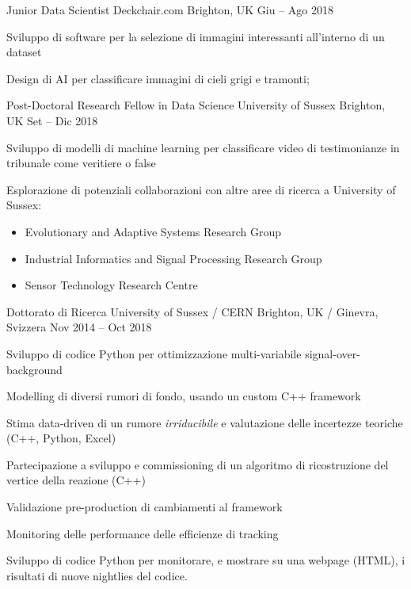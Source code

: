 \begin{cventries}
    \cventry
    {Junior Data Scientist}
    {Deckchair.com}
    {Brighton, UK}
    {Giu -- Ago 2018}
    {
      \begin{cvitems}
        \item Sviluppo di software per la selezione di immagini interessanti all'interno di un dataset
        \item Design di AI per classificare immagini di cieli grigi e tramonti;
      \end{cvitems}
    }
  \end{cventries}

  \begin{cventries}
    \cventry
    {Post-Doctoral Research Fellow in Data Science}
    {University of Sussex}
    {Brighton, UK}
    {Set -- Dic 2018}
    {
      \begin{cvitems}
        \item Sviluppo di modelli di machine learning per classificare video di testimonianze in tribunale come veritiere o false
        \item Esplorazione di potenziali collaborazioni con altre aree di ricerca a University of Sussex: 
        \begin{itemize}
          \item Evolutionary and Adaptive Systems Research Group
          \item Industrial Informatics and Signal Processing Research Group
          \item Sensor Technology Research Centre
        \end{itemize}
      \end{cvitems}
    }
  \end{cventries}

  \begin{cventries}    
    \cventry
    {Dottorato di Ricerca}
    {University of Sussex / CERN}
    {Brighton, UK / Ginevra, Svizzera}
    {Nov 2014 -- Oct 2018}
    {
    \begin{cvitems}
      \item Sviluppo di codice Python per ottimizzazione multi-variabile signal-over-background 
      \item Modelling di diversi rumori di fondo, usando un custom C++ framework
      \item Stima data-driven di un rumore \emph{irriducibile} e valutazione delle incertezze teoriche (C++, Python, Excel)
      \item Partecipazione a sviluppo e commissioning di un algoritmo di ricostruzione del vertice della reazione (C++)
      \item Validazione pre-production di cambiamenti al framework
      \item Monitoring delle performance delle efficienze di tracking
      \item Sviluppo di codice Python per monitorare, e mostrare su una webpage (HTML), i risultati di nuove nightlies del codice.
    \end{cvitems}
    }
  \end{cventries}

